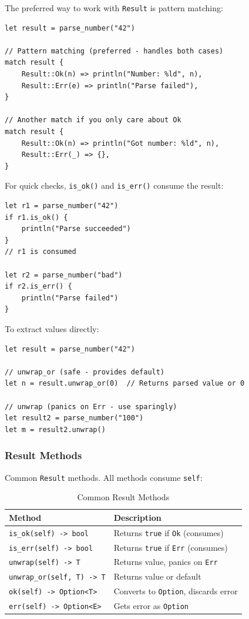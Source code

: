 The preferred way to work with \texttt{Result} is pattern matching:

\begin{lstlisting}
let result = parse_number("42")

// Pattern matching (preferred - handles both cases)
match result {
    Result::Ok(n) => println("Number: %ld", n),
    Result::Err(e) => println("Parse failed"),
}

// Another match if you only care about Ok
match result {
    Result::Ok(n) => println("Got number: %ld", n),
    Result::Err(_) => {},
}
\end{lstlisting}

For quick checks, \texttt{is\_ok()} and \texttt{is\_err()} consume the result:

\begin{lstlisting}
let r1 = parse_number("42")
if r1.is_ok() {
    println("Parse succeeded")
}
// r1 is consumed

let r2 = parse_number("bad")
if r2.is_err() {
    println("Parse failed")
}
\end{lstlisting}

To extract values directly:

\begin{lstlisting}
let result = parse_number("42")

// unwrap_or (safe - provides default)
let n = result.unwrap_or(0)  // Returns parsed value or 0

// unwrap (panics on Err - use sparingly)
let result2 = parse_number("100")
let m = result2.unwrap()
\end{lstlisting}

\subsubsection{Result Methods}

Common \texttt{Result} methods. All methods consume \texttt{self}:

\begin{table}[h]
\centering
\begin{tabular}{lp{8cm}}
\hline
\textbf{Method} & \textbf{Description} \\
\hline
\texttt{is\_ok(self) -> bool} & Returns \texttt{true} if \texttt{Ok} (consumes) \\
\texttt{is\_err(self) -> bool} & Returns \texttt{true} if \texttt{Err} (consumes) \\
\texttt{unwrap(self) -> T} & Returns value, panics on \texttt{Err} \\
\texttt{unwrap\_or(self, T) -> T} & Returns value or default \\
\texttt{ok(self) -> Option<T>} & Converts to \texttt{Option}, discards error \\
\texttt{err(self) -> Option<E>} & Gets error as \texttt{Option} \\
\hline
\end{tabular}
\caption{Common Result Methods}
\end{table}

